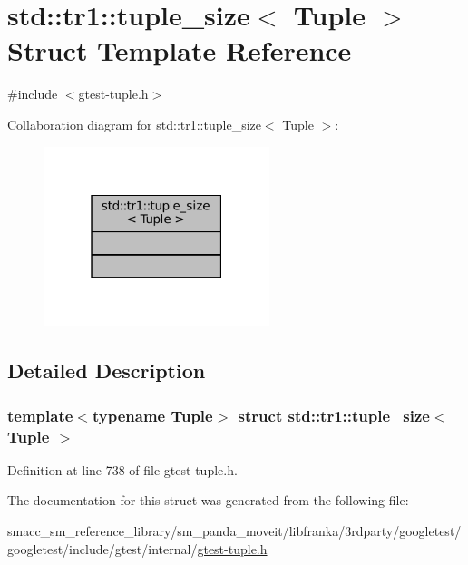 \hypertarget{structstd_1_1tr1_1_1tuple__size}{}\section{std\+:\+:tr1\+:\+:tuple\+\_\+size$<$ Tuple $>$ Struct Template Reference}
\label{structstd_1_1tr1_1_1tuple__size}


{\ttfamily \#include $<$gtest-\/tuple.\+h$>$}



Collaboration diagram for std\+:\+:tr1\+:\+:tuple\+\_\+size$<$ Tuple $>$\+:
\nopagebreak
\begin{figure}[H]
\begin{center}
\leavevmode
\includegraphics[width=187pt]{structstd_1_1tr1_1_1tuple__size__coll__graph}
\end{center}
\end{figure}


\subsection{Detailed Description}
\subsubsection*{template$<$typename Tuple$>$\newline
struct std\+::tr1\+::tuple\+\_\+size$<$ Tuple $>$}



Definition at line 738 of file gtest-\/tuple.\+h.



The documentation for this struct was generated from the following file\+:\begin{DoxyCompactItemize}
\item 
smacc\+\_\+sm\+\_\+reference\+\_\+library/sm\+\_\+panda\+\_\+moveit/libfranka/3rdparty/googletest/googletest/include/gtest/internal/\hyperlink{gtest-tuple_8h}{gtest-\/tuple.\+h}\end{DoxyCompactItemize}
